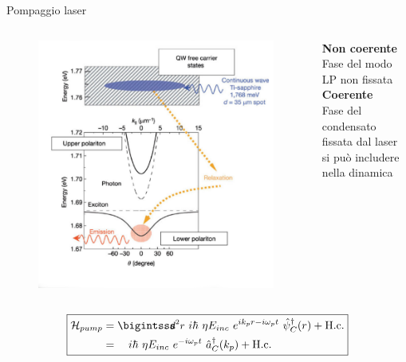 \begin{frame}{Pompaggio laser}
  \begin{columns}
 \begin{column}{.5\textwidth}
    \begin{figure}
         \includegraphics[width=\columnwidth]{pics/incoherent.png}
    \end{figure}

 \end{column}
  \begin{column}{.5\textwidth}
\footnotesize
     \textbf{Non coerente}\\
     Fase del modo LP non fissata\\
     \vskip15pt
     \textbf{Coerente}\\
     Fase del condensato fissata dal laser\\
     si può includere nella dinamica
   \end{column}
\end{columns}

 \begin{equation*}
 \boxed{
    \begin{align*}
       \ham_{pump} &=\intr i\hbar \ \eta E_{inc} \ e^{ik_p r -i\omega_p t} \ \opsi_C^\dagger (r) +\hc \\
        &= \quad i\hbar \ \eta E_{inc} \ e^{-i\omega_p t} \ \oa_C^\dagger (k_p) +\hc
    \end{align*}
    }
 \end{equation*}
\end{frame}

